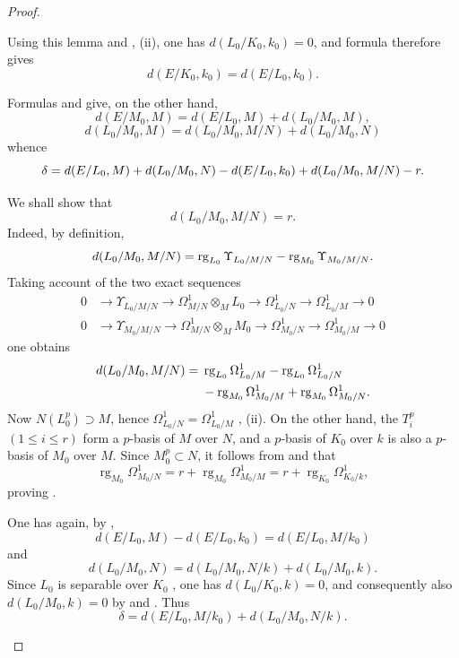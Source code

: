 \begin{proof}
\begin{enumerate}
  Using this lemma and , (ii), one has $d(L_0/K_0,k_0)=0$, and formula  therefore gives
  \[
    d(E/K_0,k_0)=d(E/L_0,k_0).
  \]

  Formulas  and  give, on the other hand,
  \[
    d(E/M_0,M)=d(E/L_0,M)+d(L_0/M_0,M),
  \]
  \[
    d(L_0/M_0,M)=d(L_0/M_0,M/N)+d(L_0/M_0,N)
  \]
  whence
  \[
    \delta=d(E/L_0,M)+d(L_0/M_0,N)- d(E/L_0,k_0)+d(L_0/M_0,M/N)- r.
  \]

  We shall show that
  \begin{equation}
  \tag{21.9.6.5}
  \label{0.21.9.6.5}
    d(L_0/M_0,M/N)=r.
  \end{equation}
  Indeed, by definition,
  \[
    d(L_0/M_0,M/N)=\operatorname{rg}_{L_0}\Upsilon_{L_0/M/N}-\operatorname{rg}_{M_0}\Upsilon_{M_0/M/N}.
  \]
  Taking account of the two exact sequences
  \[
  \begin{aligned}
    0&\longrightarrow\Upsilon_{L_0/M/N}\longrightarrow\Omega^1_{M/N}\otimes_ML_0
      \longrightarrow\Omega^1_{L_0/N}\longrightarrow\Omega^1_{L_0/M}\longrightarrow0\\
    0&\longrightarrow\Upsilon_{M_0/M/N}\longrightarrow\Omega^1_{M/N}\otimes_MM_0
      \longrightarrow\Omega^1_{M_0/N}\longrightarrow\Omega^1_{M_0/M}\longrightarrow0
  \end{aligned}
  \]
  one obtains
  \[
  \begin{split}
    d(L_0/M_0,M/N)={}&\operatorname{rg}_{L_0}\Omega^1_{L_0/M}
      -\operatorname{rg}_{L_0}\Omega^1_{L_0/N}\\
      &-\operatorname{rg}_{M_0}\Omega^1_{M_0/M}
      +\operatorname{rg}_{M_0}\Omega^1_{M_0/N}.
  \end{split}
  \]
  Now $N(L_0^p)\supset M$, hence $\Omega^1_{L_0/N}=\Omega^1_{L_0/M}$ , (ii).
  On the other hand, the $T_i^p$ $(1\leqslant i\leqslant r)$ form a $p$-basis of $M$ over $N$, and a $p$-basis of $K_0$ over $k$ is also a $p$-basis of $M_0$ over $M$.
  Since $M_0^p\subset N$, it follows from  and  that
  \[
    \operatorname{rg}_{M_0}\Omega^1_{M_0/N}
      =r+\operatorname{rg}_{M_0}\Omega^1_{M_0/M}
      =r+\operatorname{rg}_{K_0}\Omega^1_{K_0/k},
  \]
  proving .

  One has again, by ,
  \[
    d(E/L_0,M)-d(E/L_0,k_0)=d(E/L_0,M/k_0)
  \]
  and
  \[
    d(L_0/M_0,N)=d(L_0/M_0,N/k)+d(L_0/M_0,k).
  \]
  Since $L_0$ is separable over $K_0$ , one has $d(L_0/K_0,k)=0$, and consequently also $d(L_0/M_0,k)=0$ by  and .
  Thus
  \[
    \delta=d(E/L_0,M/k_0)+d(L_0/M_0,N/k).
  \]


\end{enumerate}
\end{proof}
